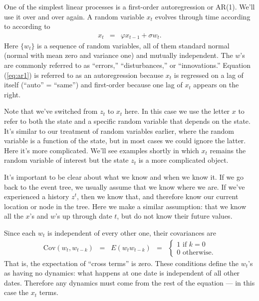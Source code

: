 \documentclass[11pt]{article}
\begin{document}
One of the simplest linear processes is a first-order autoregression or AR(1).
We'll use it over and over again.
A random variable $x_t$ evolves through time according to
according to
\begin{eqnarray}
    x_{t} &=& \varphi x_{t-1} + \sigma w_{t} .
    \label{eq:ar1}
\end{eqnarray}
Here $\{ w_t \}$ is a sequence of random variables,
all of them standard normal (normal with mean zero and variance one)
and mutually independent.
The $w$'s are commonly referred to as ``errors,'' ``disturbances,'' or ``innovations.''
Equation (\ref{eq:ar1}) is referred to as an
autoregression because $x_{t}$ is regressed on a lag of itself (``auto'' = ``same'')
and first-order because one lag of $x_{t}$ appears on the right.

Note that we've switched from $z_t$ to $x_t$ here.
In this case we use the letter $x$ to refer to both
the state and a specific random variable that depends on the state.
It's similar to our treatment of random variables earlier,
where the random variable is a function of the state, but in most cases
we could ignore the latter.
Here it's more complicated.
We'll see examples shortly in which
$x_t$ remains the random variable of interest but the state $z_t$ is a more
complicated object.

It's important to be clear about what we know and when we know it.
If we go back to the event tree, we usually assume that we know where
we are.
If we've experienced a history $z^t$, then we know that,
and therefore know our current location or node in the tree.
Here we make a similar assumption:  that we know all the
$x$'s and $w$'s up through date $t$, but do not know their future values.

Since each $w_t$ is independent of every other one,
their covariances are
\begin{eqnarray*}
    \mbox{Cov} (w_t, w_{t-k}) \;\;=\;\; E (w_t w_{t-k}) &=&
            \left\{
            \begin{array}{l}
            1  \mbox{ if } k=0  \\
            0  \mbox{ otherwise}.
            \end{array}
            \right.
\end{eqnarray*}
That is, the expectation of ``cross terms'' is zero.
These conditions define the $w_t$'s as having no dynamics:
what happens at one date is independent of all other dates.
Therefore any dynamics must come from the rest of the equation ---
in this case the $x_t$ terms.
\end{document}
